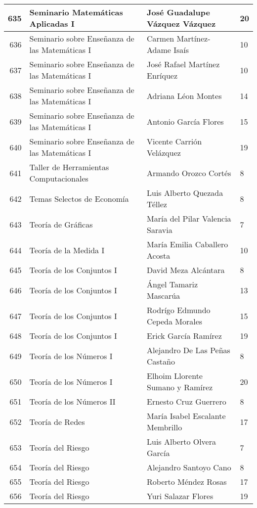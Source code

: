 \begin{table}[ht]
\begin{tabular}{rlll}
  635 & Seminario Matemáticas Aplicadas I & José Guadalupe Vázquez Vázquez & 20 \\ \hline
  636 & Seminario sobre Enseñanza de las Matemáticas I & Carmen Martínez-Adame Isaís & 10 \\ \hline
  637 & Seminario sobre Enseñanza de las Matemáticas I & José Rafael Martínez Enríquez & 10 \\ \hline
  638 & Seminario sobre Enseñanza de las Matemáticas I & Adriana Léon Montes & 14 \\ \hline
  639 & Seminario sobre Enseñanza de las Matemáticas I & Antonio García Flores & 15 \\ \hline
  640 & Seminario sobre Enseñanza de las Matemáticas I & Vicente Carrión Velázquez & 19 \\ \hline
  641 & Taller de Herramientas Computacionales & Armando Orozco Cortés & 8 \\ \hline
  642 & Temas Selectos de Economía & Luis Alberto Quezada Téllez & 8 \\ \hline
  643 & Teoría de Gráficas & María del Pilar Valencia Saravia & 7 \\ \hline
  644 & Teoría de la Medida I & María Emilia Caballero Acosta & 10 \\ \hline
  645 & Teoría de los Conjuntos I & David Meza Alcántara & 8 \\ \hline
  646 & Teoría de los Conjuntos I & Ángel Tamariz Mascarúa & 13 \\ \hline
  647 & Teoría de los Conjuntos I & Rodrígo Edmundo Cepeda Morales & 15 \\ \hline
  648 & Teoría de los Conjuntos I & Erick García Ramírez & 19 \\ \hline
  649 & Teoría de los Números I & Alejandro De Las Peñas Castaño & 8 \\ \hline
  650 & Teoría de los Números I & Elhoim Llorente Sumano y Ramírez & 20 \\ \hline
  651 & Teoría de los Números II & Ernesto Cruz Guerrero & 8 \\ \hline
  652 & Teoría de Redes & María Isabel Escalante Membrillo & 17 \\ \hline
  653 & Teoría del Riesgo & Luis Alberto Olvera García & 7 \\ \hline
  654 & Teoría del Riesgo & Alejandro Santoyo Cano & 8 \\ \hline
  655 & Teoría del Riesgo & Roberto Méndez Rosas & 17 \\ \hline
  656 & Teoría del Riesgo & Yuri Salazar Flores & 19 \\ \hline

\end{tabular}
\end{table}
